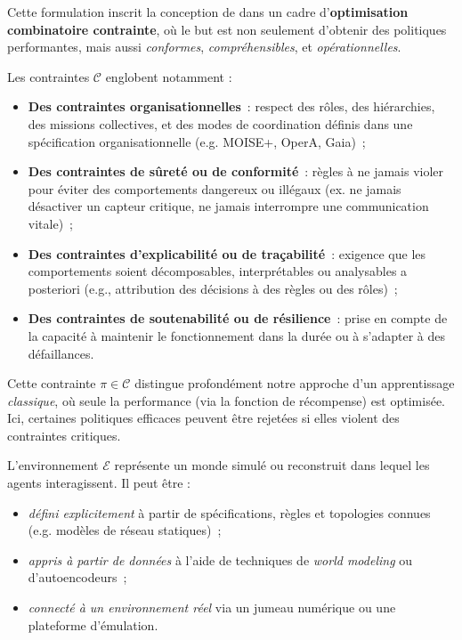 Cette formulation inscrit la conception de  dans un cadre d’\textbf{optimisation combinatoire contrainte}, où le but est non seulement d’obtenir des politiques performantes, mais aussi \emph{conformes}, \emph{compréhensibles}, et \emph{opérationnelles}.

Les contraintes $\mathcal{C}$ englobent notamment :
\begin{itemize}
  \item \textbf{Des contraintes organisationnelles}~: respect des rôles, des hiérarchies, des missions collectives, et des modes de coordination définis dans une spécification organisationnelle (e.g. MOISE+, OperA, Gaia)~;
  \item \textbf{Des contraintes de sûreté ou de conformité}~: règles à ne jamais violer pour éviter des comportements dangereux ou illégaux (ex. ne jamais désactiver un capteur critique, ne jamais interrompre une communication vitale)~;
  \item \textbf{Des contraintes d’explicabilité ou de traçabilité}~: exigence que les comportements soient décomposables, interprétables ou analysables a posteriori (e.g., attribution des décisions à des règles ou des rôles)~;
  \item \textbf{Des contraintes de soutenabilité ou de résilience}~: prise en compte de la capacité à maintenir le fonctionnement dans la durée ou à s’adapter à des défaillances.
\end{itemize}

Cette contrainte $\pi \in \mathcal{C}$ distingue profondément notre approche d’un apprentissage \textit{classique}, où seule la performance (via la fonction de récompense) est optimisée. Ici, certaines politiques efficaces peuvent être rejetées si elles violent des contraintes critiques.

L’environnement $\mathcal{E}$ représente un monde simulé ou reconstruit dans lequel les agents interagissent. Il peut être :
\begin{itemize}
  \item \emph{défini explicitement} à partir de spécifications, règles et topologies connues (e.g. modèles de réseau statiques)~;
  \item \emph{appris à partir de données} à l’aide de techniques de \textit{world modeling} ou d’autoencodeurs~;
  \item \emph{connecté à un environnement réel} via un jumeau numérique ou une plateforme d’émulation.
\end{itemize}

